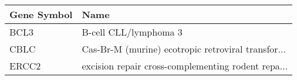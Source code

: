 \begin{tabular}{ll}
\toprule
Gene Symbol &                                               Name \\
\midrule
       BCL3 &                              B-cell CLL/lymphoma 3 \\
       CBLC & Cas-Br-M (murine) ecotropic retroviral transfor... \\
      ERCC2 & excision repair cross-complementing rodent repa... \\
\bottomrule
\end{tabular}
